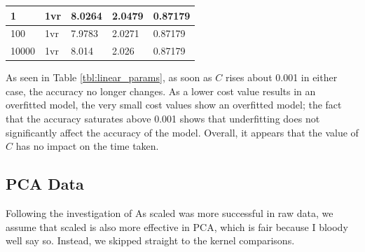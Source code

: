 \documentclass[a4paper, 10pt, conference]{ieeeconf}
\begin{document}
\begin{table}[!ht]
\begin{tabular}{lllll}
1 & 1vr & 8.0264 & 2.0479 & 0.87179\\ \hline
100 & 1vr & 7.9783 & 2.0271 & 0.87179\\ \hline
10000 & 1vr  & 8.014 & 2.026 & 0.87179\\ \hline
\end{tabular}
\end{table}

As seen in Table \ref{tbl:linear_params}, as soon as $C$ rises about 0.001 in either case, the accuracy no longer changes. As a lower cost value results in an overfitted model, the very small cost values show an overfitted model; the fact that the accuracy saturates above 0.001 shows that underfitting does not significantly affect the accuracy of the model. Overall, it appears that the value of $C$ has no impact on the time taken.

\subsection{PCA Data}
Following the investigation of  As scaled was more successful in raw data, we assume that scaled is also more effective in PCA, which is fair because I bloody well say so. Instead, we skipped straight to the kernel comparisons.
\end{document}
